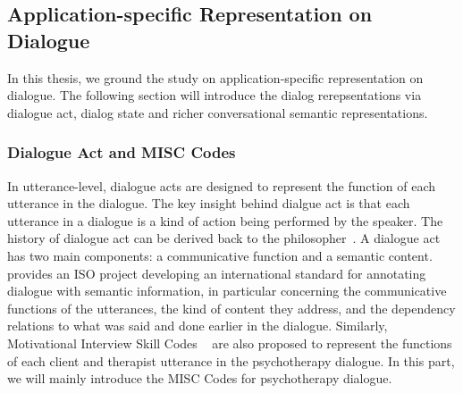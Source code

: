 \subsection{Application-specific Representation on Dialogue}
\label{ssec:bg:dialogue-mr}

In this thesis, we ground the study on application-specific
representation on dialogue. The following section will introduce the
dialog rerepsentations via dialogue act, dialog state and richer
conversational semantic representations.

\subsubsection{Dialogue Act and MISC Codes}
\label{sssec:bg:dialogue-act}
In utterance-level, dialogue acts are designed to represent the
function of each utterance in the dialogue. The key insight behind
dialgue act is that each utterance in a dialogue is a kind of action
being performed by the speaker. The history of dialogue act can be
derived back to the philosopher~\citet{wittgenstein2010philosophical}.
A dialogue act has two main components: a communicative function and a
semantic content. \citet{bunt2010towards} provides an ISO project
developing an international standard for annotating dialogue with
semantic information, in particular concerning the communicative
functions of the utterances, the kind of content they address, and the
dependency relations to what was said and done earlier in the
dialogue. Similarly, Motivational Interview Skill Codes
~\cite[MISC,][]{miller2003motivational,miller2012motivational} are
also proposed to represent the functions of each client and therapist
utterance in the psychotherapy dialogue. In this part, we will mainly
introduce the MISC Codes for psychotherapy dialogue.

